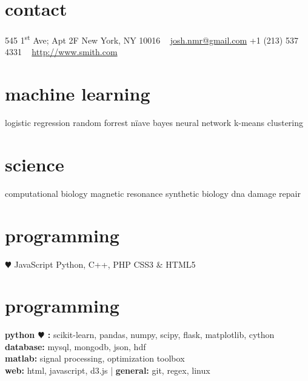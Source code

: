 \documentclass[]{friggeri-cv} %
\begin{document}


\begin{aside} %
\section{contact}
545 1\textsuperscript{st} Ave; Apt 2F
New York, NY 10016
~
\href{mailto:josh.nmr@gmail.com}{josh.nmr@gmail.com}{\color{brown} } 
+1 (213) 537 4331{\color{brown} }
~
\href{http://www.smith.com}{http://www.smith.com}
\section{machine learning}
logistic regression
random forrest
n{\"i}ave bayes
neural network
k-means clustering
\section{science}
computational biology
magnetic resonance
synthetic biology
dna damage repair
\section{programming}
{\color{red} $\varheartsuit$} JavaScript
Python, C++, PHP
CSS3 \& HTML5
\end{aside}


\section{programming}

\textbf{{python {\color{red}$\varheartsuit$}} :} scikit-learn, pandas, numpy, scipy, flask, matplotlib, cython  \\ \textbf{database:} mysql, mongodb, json, hdf \\ \textbf{matlab:} signal processing, optimization toolbox \\ \textbf{web:} html, javascript, d3.js  |  \textbf{general:} git, regex, linux
\end{document}
